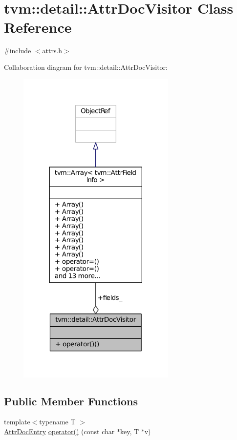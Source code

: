 \hypertarget{classtvm_1_1detail_1_1AttrDocVisitor}{}\section{tvm\+:\+:detail\+:\+:Attr\+Doc\+Visitor Class Reference}
\label{classtvm_1_1detail_1_1AttrDocVisitor}


{\ttfamily \#include $<$attrs.\+h$>$}



Collaboration diagram for tvm\+:\+:detail\+:\+:Attr\+Doc\+Visitor\+:
\nopagebreak
\begin{figure}[H]
\begin{center}
\leavevmode
\includegraphics[width=222pt]{classtvm_1_1detail_1_1AttrDocVisitor__coll__graph}
\end{center}
\end{figure}
\subsection*{Public Member Functions}
\begin{DoxyCompactItemize}
\item 
{\footnotesize template$<$typename T $>$ }\\\hyperlink{classtvm_1_1detail_1_1AttrDocEntry}{Attr\+Doc\+Entry} \hyperlink{classtvm_1_1detail_1_1AttrDocVisitor_a1091752fc7d78b471b034877ad9344b3}{operator()} (const char $\ast$key, T $\ast$v)
\end{DoxyCompactItemize}
